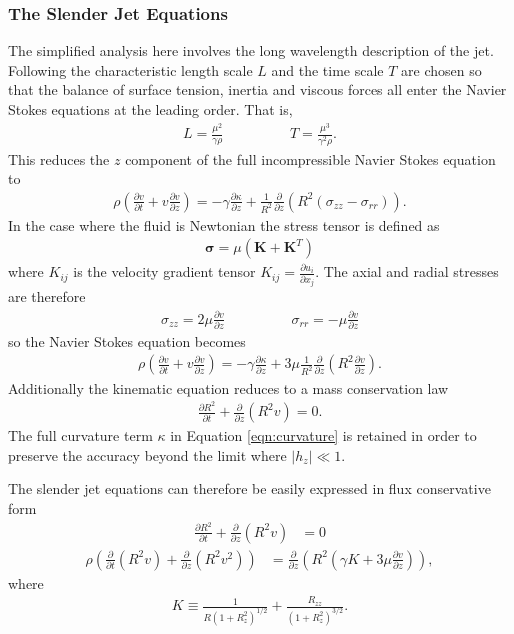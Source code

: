\documentclass[11pt]{article}
\newcommand{\pd}[2]{\frac{\partial #1}{\partial #2}}
\begin{document}
\subsubsection{The Slender Jet Equations} \label{sec:slender}
The simplified analysis here involves the long wavelength description of the jet. Following \cite{eggers2008physics} the characteristic length scale $L$ and the time scale $T$ are chosen so that the balance of surface tension, inertia and viscous forces all enter the Navier Stokes equations at the leading order. That is,
\begin{align*}
L = \frac{\mu^2}{\gamma \rho} \hspace{2cm} T = \frac{\mu^3}{\gamma^2 \rho}.
\end{align*}
This reduces the $z$ component of the full incompressible Navier Stokes equation to
\begin{align*}
\rho \left( \pd{v}{t} + v \pd{v}{z} \right) = -\gamma \pd{\kappa}{z} + \frac{1}{R^2} \pd{}{z} \left(R^2 (\sigma_{zz} - \sigma_{rr}) \right).
\end{align*}
In the case where the fluid is Newtonian the stress tensor is defined as
\begin{align*}
\mathbf{\sigma} = \mu (\mathbf{K} + \mathbf{K}^T)
\end{align*}
where $K_{ij}$ is the velocity gradient tensor $K_{ij} = \pd{u_i}{x_j}$. The axial and radial stresses are therefore
\begin{align*}
\sigma_{zz} = 2\mu \pd{v}{z} \hspace{2cm} \sigma_{rr} = -\mu \pd{v}{z}
\end{align*}
so the Navier Stokes equation becomes
\begin{align*}
\rho \left( \pd{v}{t} + v \pd{v}{z} \right) = - \gamma \pd{\kappa}{z} + 3 \mu \frac{1}{R^2} \pd{}{z} \left(R^2 \pd{v}{z} \right).
\end{align*}
Additionally the kinematic equation reduces to a mass conservation law
\begin{align*}
\pd{R^2}{t} + \pd{}{z}(R^2 v) = 0.
\end{align*}
The full curvature term $\kappa$ in Equation \ref{eqn:curvature} is retained in order to preserve the accuracy beyond the limit where $|h_z| \ll 1$.

The slender jet equations can therefore be easily expressed in flux conservative form
\begin{align}
\pd{R^2}{t} + \pd{}{z} (R^2v) &= 0 \label{eqn:mass_con}
\end{align}
\begin{align}
\rho \left( \pd{}{t} (R^2v) + \pd{}{z} (R^2v^2) \right) &= \pd{}{z} \left(R^2 \left( \gamma K + 3 \mu \pd{v}{z}\right) \right), \label{eqn:mom_con}
\end{align}
where
\begin{align*}
K \equiv \frac{1}{R(1+R_z^2)^{1/2}} + \frac{R_{zz}}{(1 + R_z^2)^{3/2}}.
\end{align*}
\end{document}
